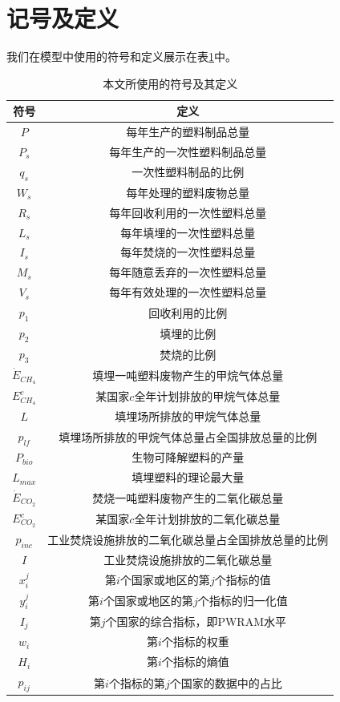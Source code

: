 \documentclass[UTF8, fontset=windows]{mcmthesis}
\begin{document}
\section{记号及定义}

我们在模型中使用的符号和定义展示在表\ref{tab:notation}中。

\begin{table}[h]
\centering
\begin{tabular}{cc}
\toprule
符号 & 定义\\
\midrule
$P$ & 每年生产的塑料制品总量\\
$P_s$ & 每年生产的一次性塑料制品总量\\
$q_s$ & 一次性塑料制品的比例\\
$W_s$ & 每年处理的塑料废物总量\\
$R_s$ & 每年回收利用的一次性塑料总量\\
$L_s$ & 每年填埋的一次性塑料总量\\
$I_s$ & 每年焚烧的一次性塑料总量\\
$M_s$ & 每年随意丢弃的一次性塑料总量\\
$V_s$ & 每年有效处理的一次性塑料总量\\
$p_1$ & 回收利用的比例\\
$p_2$ & 填埋的比例\\
$p_3$ & 焚烧的比例\\
$\dot{E}_{CH_4}$ & 填埋一吨塑料废物产生的甲烷气体总量\\
$E_{CH_4}^c$ & 某国家$c$全年计划排放的甲烷气体总量\\
$L$ & 填埋场所排放的甲烷气体总量\\
$p_{lf}$ & 填埋场所排放的甲烷气体总量占全国排放总量的比例\\
$P_{bio}$ & 生物可降解塑料的产量\\
$L_{max}$ & 填埋塑料的理论最大量\\
$\dot{E}_{CO_2}$ & 焚烧一吨塑料废物产生的二氧化碳总量\\
$E_{CO_2}^c$ & 某国家$c$全年计划排放的二氧化碳总量\\
$p_{inc}$ & 工业焚烧设施排放的二氧化碳总量占全国排放总量的比例\\
$I$ & 工业焚烧设施排放的二氧化碳总量\\
$x_i^j$ & 第$i$个国家或地区的第$j$个指标的值\\
$y_i^j$ & 第$i$个国家或地区的第$j$个指标的归一化值\\
$I_j$ & 第$j$个国家的综合指标，即PWRAM水平\\
$w_i$ & 第$i$个指标的权重\\
$H_i$ & 第$i$个指标的熵值\\
$p_{ij}$ & 第$i$个指标的第$j$个国家的数据中的占比\\
\bottomrule
\end{tabular}
\caption{本文所使用的符号及其定义}
\label{tab:notation}
\end{table}
\end{document}

